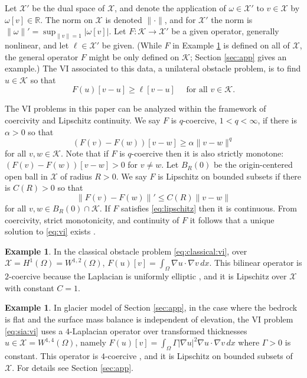 \documentclass[]{interact}
\theoremstyle{plain}%
\theoremstyle{definition}
\newtheorem{example}[theorem]{Example}
\theoremstyle{remark}
\newcommand{\RR}{\mathbb{R}}
\newcommand{\grad}{\nabla}
\newcommand{\cK}{\mathcal{K}}
\newcommand{\cX}{\mathcal{X}}
\begin{document}
Let $\cX'$ be the dual space of $\cX$, and denote the application of $\omega \in \cX'$ to $v\in \cX$ by $\omega[v] \in \RR$.  The norm on $\cX$ is denoted $\|\cdot\|$, and for $\cX'$ the norm is $\|\omega\|' = \sup_{\|v\|=1} |\omega[v]|$.  Let $F:\cK \to \cX'$ be a given operator, generally nonlinear, and let $\ell\in \cX'$ be given.  (While $F$ in Example \ref{example:classicalobstacle} is defined on all of $\cX$, the general operator $F$ might be only defined on $\cK$; Section \ref{sec:app} gives an example.)  The VI associated to this data, a unilateral obstacle problem, is to find $u\in \cK$ so that
\begin{equation} \label{eq:vi}
F(u)[v - u] \ge \ell[v - u] \quad \text{ for all } v \in \cK.
\end{equation}

The VI problems in this paper can be analyzed within the framework of coercivity and Lipschitz continuity.  We say $F$ is $q$-coercive, $1<q<\infty$, if there is $\alpha>0$ so that
\begin{equation} \label{eq:coercive}
(F(v) - F(w))[v - w] \ge \alpha \|v-w\|^q
\end{equation}
for all $v,w \in \cK$.  Note that if $F$ is $q$-coercive then it is also strictly monotone: $(F(v) - F(w))[v - w] > 0$ for $v\ne w$.  Let $B_R(0)$ be the origin-centered open ball in $\cX$ of radius $R>0$.  We say $F$ is Lipschitz on bounded subsets if there is $C(R)>0$ so that
\begin{equation} \label{eq:lipschitz}
\|F(v)-F(w)\|' \le C(R) \|v-w\|
\end{equation}
for all $v,w \in B_R(0)\cap \cK$.  If $F$ satisfies \eqref{eq:lipschitz} then it is continuous.  From coercivity, strict monotonicity, and continuity of $F$ it follows that a unique solution to \eqref{eq:vi} exists \cite[Corollary III.1.8]{KinderlehrerStampacchia1980}.

\begin{example}  \label{example:classicalobstacle}
In the classical obstacle problem \eqref{eq:classical:vi}, over $\cX=H^1(\Omega)=W^{1,2}(\Omega)$, $F(u)[v] = \int_\Omega \grad u\cdot \grad v\,dx$.  This bilinear operator is $2$-coercive because the Laplacian is uniformly elliptic \cite{Evans2010}, and it is Lipschitz over $\cX$ with constant $C=1$.
\end{example}

\begin{example}  \label{example:flatsia}
In glacier model of Section \ref{sec:app}, in the case where the bedrock is flat and the surface mass balance is independent of elevation, the VI problem \eqref{eq:sia:vi} uses a $4$-Laplacian operator over transformed thicknesses $u\in\cX=W^{1,4}(\Omega)$, namely $F(u)[v] = \int_\Omega \Gamma |\grad u|^2\grad u\cdot \grad v\,dx$ where $\Gamma>0$ is constant.  This operator is $4$-coercive \cite[for example]{JouvetBueler2012}, and it is Lipschitz on bounded subsets of $\cX$.  For details see Section \ref{sec:app}.
\end{example}
\end{document}
